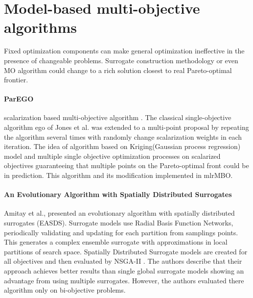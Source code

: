     \section{Model-based multi-objective algorithms}
        Fixed optimization components can make general optimization ineffective in the presence of changeable problems. Surrogate construction methodology or even MO algorithm could change to a rich solution closest to real Pareto-optimal frontier.

        \paragraph{ParEGO}\label{alg:ParEGO} scalarization based multi-objective algorithm \cite{Knowles06}. The classical single-objective algorithm \gls{ego} \cite{JonesSW98} of Jones et al. was extended to a multi-point proposal by repeating the algorithm several times with randomly change scalarization weights in each iteration.  The idea of algorithm based on Kriging(Gaussian process regression) model and multiple single objective optimization processes on scalarized objectives guaranteeing that multiple points on the Pareto-optimal front could be in prediction. This algorithm and its modification implemented in mlrMBO\cite{BischlmlrMBO}.


        \paragraph{An Evolutionary Algorithm with Spatially Distributed Surrogates} Amitay et al.,\cite{DistrSurr} presented an evolutionary algorithm with spatially distributed surrogates (EASDS). Surrogate models use Radial Basis Function Networks, periodically validating and updating for each partition from samplings points. This generates a complex ensemble surrogate with approximations in local partitions of search space. Spatially Distributed Surrogate models are created for all objectives and then evaluated by NSGA-II \cite{DistrSurr}. The authors describe that their approach achieves better results than single global surrogate models showing an advantage from using multiple surrogates. However, the authors evaluated there algorithm only on bi-objective problems.

